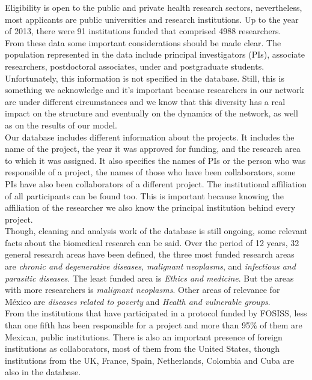 \documentclass[11pt]{article}
\begin{document}
Eligibility is open to the public and private health research sectors,
nevertheless, most applicants are public universities and research
institutions. Up to the year of 2013, there were 91 institutions funded that
comprised 4988 researchers.\\ 

From these data some important considerations should be made clear. The
population represented in the data include principal investigators (PIs),
associate researchers, postdoctoral associates, under and postgraduate
students. Unfortunately, this information is not specified in the
database. Still, this is something we acknowledge and it's important because
researchers in our network are under different circumstances and we know
that this diversity has a real impact on the structure and eventually on the
dynamics of the network, as well as on the results of our model.\\  

Our database includes different information about the projects. It includes the
name of the project, the year it was approved for funding, and the research area
to which it was assigned. It also specifies the names of PIs or the person who
was responsible of a project, the names of those who have been collaborators,
some PIs have also been collaborators of a different project. The institutional
affiliation of all participants can be found too. This is important because
knowing the affiliation of the researcher we also know the principal institution
behind every project.\\ 

Though, cleaning and analysis work of the database is still ongoing, some
relevant facts about the biomedical research can be said. Over the period of 12
years, 32 general research areas have been defined, the three most funded
research areas are \emph{chronic and degenerative diseases}, \emph{malignant
  neoplasms}, and \emph{infectious and parasitic diseases}. The least funded
area is \emph{Ethics and medicine}. But the areas with more researchers is
\emph{malignant neoplasms}. Other areas of relevance for M\'exico are
\emph{diseases related to poverty} and \emph{Health and vulnerable groups}. \\  

From the institutions that have participated in a protocol funded by FOSISS,
less than one fifth has been responsible for a project and more than 95\% of
them are Mexican, public institutions. There is also an important presence of
foreign institutions as collaborators, most of them from the United States,
though institutions from the UK, France, Spain, Netherlands, Colombia and Cuba
are also in the database.\\ 
\end{document}
